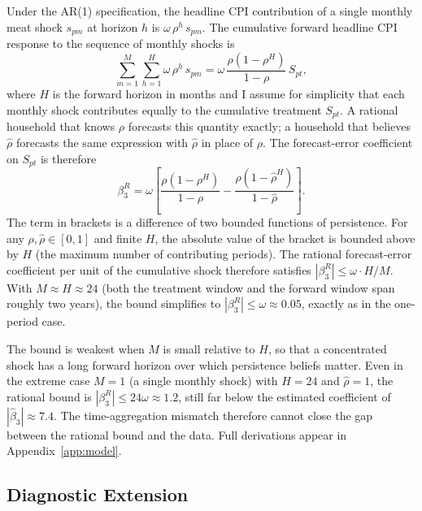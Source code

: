 Under the AR(1) specification, the headline CPI contribution
of a single monthly meat shock $s_{pm}$ at horizon $h$ is
$\omega\,\rho^{h}\,s_{pm}$.
The cumulative forward headline CPI response to the sequence
of monthly shocks is
\begin{equation}\label{eq:time_agg_cpi}
  \sum_{m=1}^{M}\sum_{h=1}^{H}\omega\,\rho^{h}\,s_{pm}
  = \omega\,\frac{\rho(1-\rho^{H})}{1-\rho}\,S_{pt},
\end{equation}
where $H$ is the forward horizon in months and I assume for
simplicity that each monthly shock contributes equally to the
cumulative treatment $S_{pt}$.
A rational household that knows $\rho$ forecasts this quantity
exactly; a household that believes $\hat{\rho}$ forecasts the
same expression with $\hat{\rho}$ in place of $\rho$.
The forecast-error coefficient on $S_{pt}$ is therefore
\begin{equation}\label{eq:time_agg_bound}
  \beta_3^{R}
  = \omega\left[
      \frac{\rho(1-\rho^{H})}{1-\rho}
    - \frac{\hat{\rho}(1-\hat{\rho}^{H})}{1-\hat{\rho}}
    \right].
\end{equation}
The term in brackets is a difference of two bounded functions
of persistence.
For any $\rho, \hat{\rho} \in [0,1]$ and finite $H$, the
absolute value of the bracket is bounded above by
$H$ (the maximum number of contributing periods).
The rational forecast-error coefficient per unit of the
cumulative shock therefore satisfies
$|\beta_3^R| \leq \omega \cdot H / M$.
With $M \approx H \approx 24$ (both the treatment window and
the forward window span roughly two years), the bound simplifies
to $|\beta_3^R| \leq \omega \approx 0.05$, exactly as in the
one-period case.

The bound is weakest when $M$ is small relative to $H$, so
that a concentrated shock has a long forward horizon over which
persistence beliefs matter.
Even in the extreme case $M = 1$ (a single monthly shock)
with $H = 24$ and $\hat{\rho} = 1$, the rational bound is
$|\beta_3^R| \leq 24\omega \approx 1.2$, still far below the
estimated coefficient of $|\hat{\beta}_3| \approx 7.4$.
The time-aggregation mismatch therefore cannot close the gap
between the rational bound and the data.
Full derivations appear in Appendix~\ref{app:model}.

\subsection{Diagnostic Extension}\label{sec:diagnostic_extension}

